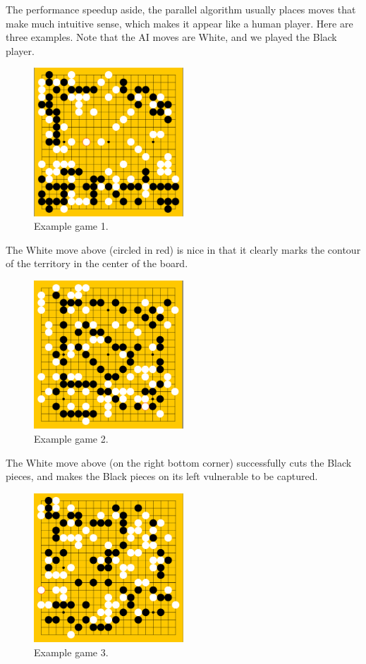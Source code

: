 \documentclass[11pt]{article}
\begin{document}
The performance speedup aside, the parallel algorithm usually places moves that make much intuitive sense, which makes it appear like a human player. Here are three examples. Note that the AI moves are White, and we played the Black player.
\begin{figure}[H]
    \centering
    \includegraphics[width=0.5\textwidth]{game_1.png}
    \caption{Example game 1.}
\end{figure}
The White move above (circled in red) is nice in that it clearly marks the contour of the territory in the center of the board.
\begin{figure}[H]
    \centering
    \includegraphics[width=0.5\textwidth]{game_2.png}
    \caption{Example game 2.}
\end{figure}
The White move above (on the right bottom corner) successfully cuts the Black pieces, and makes the Black pieces on its left vulnerable to be captured. 
\begin{figure}[H]
    \centering
    \includegraphics[width=0.5\textwidth]{game_3.png}
    \caption{Example game 3.}
\end{figure}
\end{document}
